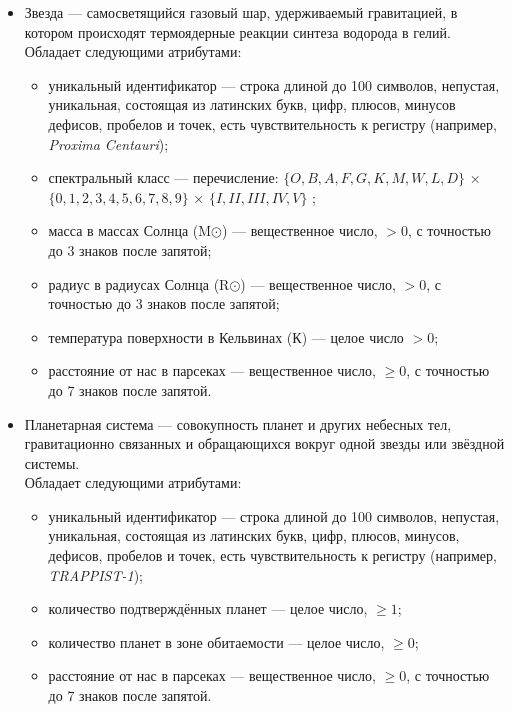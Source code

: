 \documentclass[14pt,a4paper]{extarticle}
\begin{document}
\begin{itemize}
		\item Звезда --- самосветящийся газовый шар, удерживаемый гравитацией, в котором происходят термоядерные реакции синтеза водорода в гелий.\\
		Обладает следующими атрибутами:
		\begin{itemize}
			\item уникальный идентификатор --- строка длиной до 100 символов, непустая, уникальная, состоящая из латинских букв, цифр, плюсов, минусов дефисов, пробелов и точек, есть чувствительность к регистру (например, \textit{Proxima Centauri});
			\item спектральный класс --- перечисление: $\{O, B, A, F, G, K, M, W, L, D\}$ × $\{0, 1 ,2 ,3, 4, 5, 6, 7, 8, 9\}$ × $\{I, II, III, IV, V\} $ \cite{stellar-classes};
			\item масса в массах Солнца (M$\odot$) --- вещественное число, $> 0$, с точностью до 3 знаков после запятой;
			\item радиус в радиусах Солнца (R$\odot$) --- вещественное число, $> 0$, с точностью до 3 знаков после запятой;
			\item температура поверхности в Кельвинах (К) --- целое число $> 0$;
			\item расстояние от нас в парсеках --- вещественное число, $\geq 0$, с точностью до 7 знаков после запятой.
		\end{itemize}
		
		\item Планетарная система --- совокупность планет и других небесных тел, гравитационно связанных и обращающихся вокруг одной звезды или звёздной системы.\\
		Обладает следующими атрибутами:
		\begin{itemize}
			\item уникальный идентификатор --- строка длиной до 100 символов, непустая, уникальная, состоящая из латинских букв, цифр, плюсов, минусов, дефисов, пробелов и точек, есть чувствительность к регистру (например, \textit{TRAPPIST-1});
			\item количество подтверждённых планет --- целое число, $\geq 1$;
			\item количество планет в зоне обитаемости --- целое число, $\geq 0$;
			\item расстояние от нас в парсеках --- вещественное число, $\geq 0$, с точностью до 7 знаков после запятой.
		\end{itemize}
		

\end{itemize}
\end{document}
